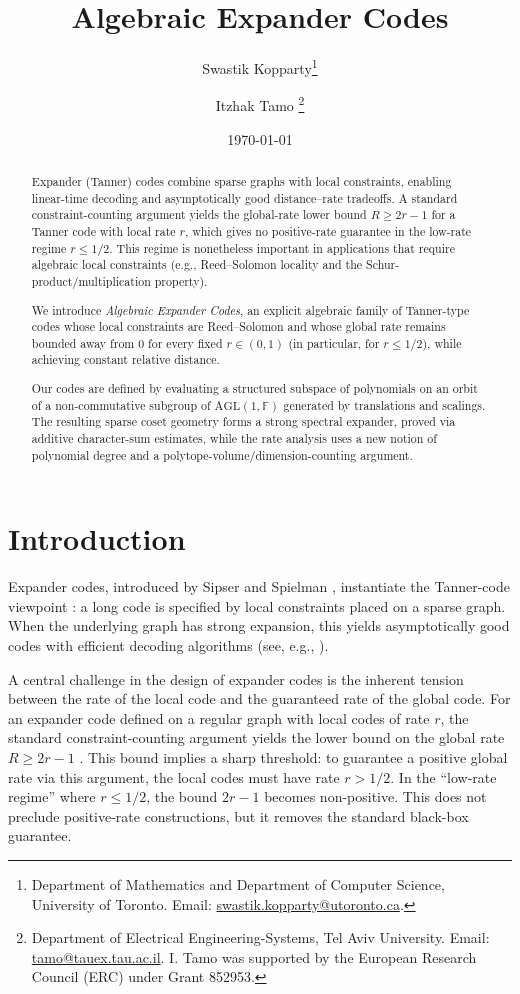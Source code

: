 \documentclass[11pt]{article}
\title{Algebraic Expander Codes}
\author{Swastik Kopparty\thanks{
Department of Mathematics and Department of Computer Science, University of Toronto. Email: \url{swastik.kopparty@utoronto.ca}.
} \and Itzhak Tamo
\thanks{ Department of Electrical Engineering-Systems, Tel Aviv
University. Email: \url{tamo@tauex.tau.ac.il}. I. Tamo was supported  by the European Research Council (ERC) under Grant 852953.}}
\date{\today}
\theoremstyle{plain}
\theoremstyle{definition}
\begin{document}
\maketitle

\begin{abstract}
Expander (Tanner) codes combine sparse graphs with local constraints, enabling linear-time decoding and asymptotically good distance--rate tradeoffs. A standard constraint-counting argument yields the global-rate lower bound $R\ge 2r-1$ for a Tanner code with local rate $r$, which gives no positive-rate guarantee in the low-rate regime $r\le 1/2$. This regime is nonetheless important in applications that require algebraic local constraints (e.g., Reed--Solomon locality and the Schur-product/multiplication property).

We introduce \emph{Algebraic Expander Codes}, an explicit algebraic family of Tanner-type codes whose local constraints are Reed--Solomon and whose global rate remains bounded away from $0$ for every fixed $r\in(0,1)$ (in particular, for $r\le 1/2$), while achieving constant relative distance.

Our codes are defined by evaluating a structured subspace of polynomials on an orbit of a non-commutative subgroup of $\mathrm{AGL}(1,\mathbb{F})$ generated by translations and scalings. The resulting sparse coset geometry forms a strong spectral expander, proved via additive character-sum estimates, while the rate analysis uses a new notion of polynomial degree and a polytope-volume/dimension-counting argument.
\end{abstract}




\section{Introduction}

Expander codes, introduced by Sipser and Spielman \cite{SipserSp96}, instantiate the Tanner-code viewpoint \cite{tanner1981recursive}: a long code is specified by local constraints placed on a sparse graph.
When the underlying graph has strong expansion, this yields asymptotically good codes with efficient decoding algorithms (see, e.g., \cite{SipserSp96,zemore-expander-decoding,hlw2006expander}).



A central challenge in the design of expander codes is the inherent tension between the rate of the local code and the guaranteed rate of the global code. For an expander  code defined on a regular graph with local codes of rate $r$, the standard constraint-counting argument yields the lower bound on the global rate $R \ge 2r - 1$ \cite{tanner1981recursive}.
This bound implies a sharp threshold: to guarantee a positive global rate via this argument, the local codes must have rate $r > 1/2$. In the ``low-rate regime'' where $r \le 1/2$, the bound $2r-1$ becomes non-positive. This does not preclude positive-rate constructions, but it removes the standard black-box guarantee.
\end{document}
